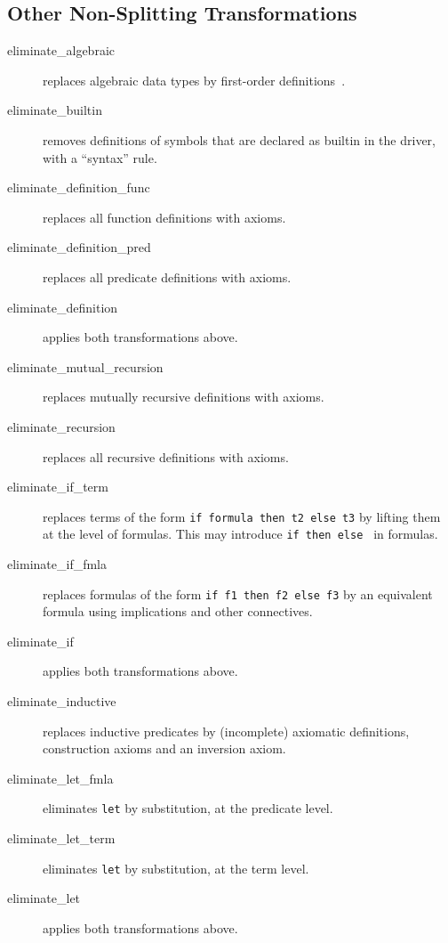 \subsection{Other Non-Splitting Transformations}

\begin{description}

\item[eliminate\_algebraic] replaces algebraic data types by first-order
definitions~\cite{paskevich09rr}.

\item[eliminate\_builtin] removes definitions of symbols that are
  declared as builtin in the driver, \ie with a ``syntax'' rule.
\item[eliminate\_definition\_func]
  replaces all function definitions with axioms.
\item[eliminate\_definition\_pred]
  replaces all predicate definitions with axioms.
\item[eliminate\_definition]
  applies both transformations above.
\item[eliminate\_mutual\_recursion]
  replaces mutually recursive definitions with axioms.
\item[eliminate\_recursion]
  replaces all recursive definitions with axioms.

\item[eliminate\_if\_term] replaces terms of the form \texttt{if
    formula then t2 else t3} by lifting them at the level of formulas.
  This may introduce \texttt{if then else } in formulas.

\item[eliminate\_if\_fmla] replaces formulas of the form \texttt{if f1 then f2
  else f3} by an equivalent formula using implications and other
  connectives.

\item[eliminate\_if]
  applies both transformations above.

\item[eliminate\_inductive] replaces inductive predicates by
  (incomplete) axiomatic definitions, \ie construction axioms and
  an inversion axiom.

\item[eliminate\_let\_fmla]
  eliminates \texttt{let} by substitution, at the predicate level.

\item[eliminate\_let\_term]
  eliminates \texttt{let} by substitution, at the term level.

\item[eliminate\_let]
  applies both transformations above.


\end{description}
